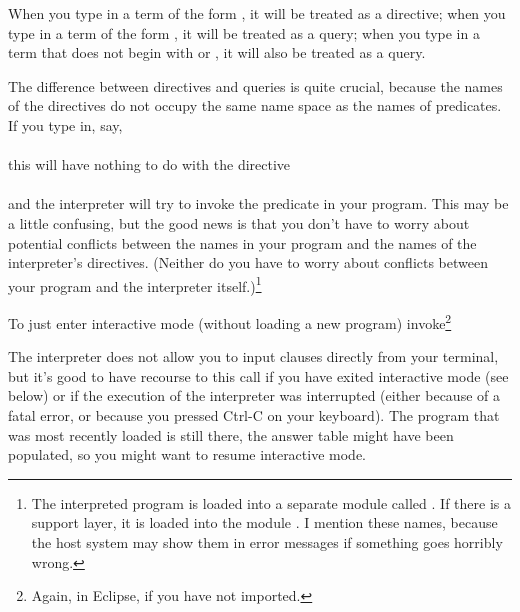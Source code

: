 When you type in a term of the form , it will be treated
as a directive; when you type in a term of the form
, it will be treated as a query; when you
type in a term that does not begin with \prog{:-} or , it will also
be treated as a query.

The difference between directives and queries is quite crucial, because the
names of the directives do not occupy the same name space
as the names of predicates.  If you type in, say,\\
\ind{}\\
this will have nothing to do with the directive\\
\ind{}\\
and the interpreter will try to invoke the predicate  in your
program.  This may be a little confusing, but the good news is that you don't
have to worry about potential conflicts between the names in your program and
the names of the interpreter's directives.  (Neither do you have to worry
about conflicts between your program and the interpreter itself.)\footnote{
  The interpreted program is loaded into a separate module
  called .  If there is a support layer, it is loaded
  into the module .  I mention these names, because the host
  system may show them in error messages if something goes horribly wrong.
}

\vfill %


%

To just enter interactive mode (without loading a new program)
invoke\footnote{
  Again,  in Eclipse, if you have not imported.}\\
\ind{}

The interpreter does not allow you to input clauses directly from your
terminal, but it's good to have recourse to this call if you have exited
interactive mode (see below) or if the execution of the interpreter was
interrupted (either because of a fatal error, or because you pressed Ctrl-C
on your keyboard). The program that was most recently loaded is still there,
the answer table might have been populated, so you might want to resume
interactive mode.


%

